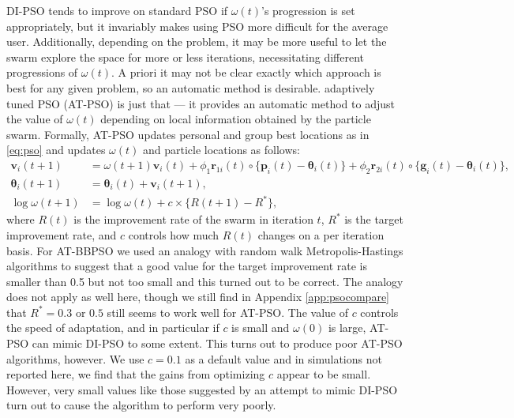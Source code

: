\documentclass[12pt]{article}
\begin{document}
DI-PSO tends to improve on standard PSO if $\omega(t)$'s progression is set appropriately, but it invariably makes using PSO more difficult for the average user. Additionally, depending on the problem, it may be more useful to let the swarm explore the space for more or less iterations, necessitating different progressions of $\omega(t)$. A priori it may not be clear exactly which approach is best for any given problem, so an automatic method is desirable. adaptively tuned PSO (AT-PSO) is just that --- it provides an automatic method to adjust the value of $\omega(t)$ depending on local information obtained by the particle swarm. Formally, AT-PSO updates personal and group best locations as in \eqref{eq:pso} and updates $\omega(t)$ and particle locations as follows:
\begin{align}\label{eq:atpso}
\bm{v}_i(t+1) &= \omega(t+1) \bm{v}_i(t) + \phi_1 \bm{r}_{1i}(t)\circ\{\bm{p}_i(t) - \bm{\theta}_i(t)\} + \phi_2 \bm{r}_{2i}(t)\circ\{\bm{g}_i(t) - \bm{\theta}_i(t)\},\nonumber\\
\bm{\theta}_i(t+1) &= \bm{\theta}_i(t) + \bm{v}_i(t+1),\nonumber\\
\log\omega(t+1)& = \log\omega(t) + c\times\{R(t+1) - R^*\},
\end{align}
where $R(t)$ is the improvement rate of the swarm in iteration $t$, $R^*$ is the target improvement rate, and $c$ controls how much $R(t)$ changes on a per iteration basis. For AT-BBPSO we used an analogy with random walk Metropolis-Hastings algorithms to suggest that a good value for the target improvement rate is smaller than 0.5 but not too small and this turned out to be correct. The analogy does not apply as well here, though we still find in Appendix \ref{app:psocompare} that $R^*=0.3$ or $0.5$ still seems to work well for AT-PSO. The value of $c$ controls the speed of adaptation, and in particular if $c$ is small and $\omega(0)$ is large, AT-PSO can mimic DI-PSO to some extent. This turns out to produce poor AT-PSO algorithms, however. We use $c=0.1$ as a default value and in simulations not reported here, we find that the gains from optimizing $c$ appear to be small. However, very small values like those suggested by an attempt to mimic DI-PSO turn out to cause the algorithm to perform very poorly. 
\end{document}
